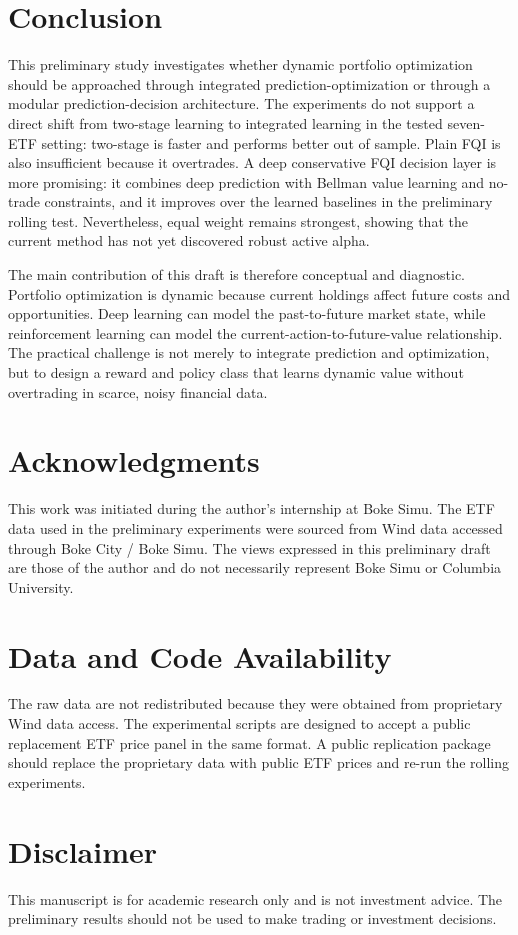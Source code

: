 \documentclass[11pt]{article}
\begin{document}
\section{Conclusion}

This preliminary study investigates whether dynamic portfolio optimization should be approached through integrated prediction-optimization or through a modular prediction-decision architecture. The experiments do not support a direct shift from two-stage learning to integrated learning in the tested seven-ETF setting: two-stage is faster and performs better out of sample. Plain FQI is also insufficient because it overtrades. A deep conservative FQI decision layer is more promising: it combines deep prediction with Bellman value learning and no-trade constraints, and it improves over the learned baselines in the preliminary rolling test. Nevertheless, equal weight remains strongest, showing that the current method has not yet discovered robust active alpha.

The main contribution of this draft is therefore conceptual and diagnostic. Portfolio optimization is dynamic because current holdings affect future costs and opportunities. Deep learning can model the past-to-future market state, while reinforcement learning can model the current-action-to-future-value relationship. The practical challenge is not merely to integrate prediction and optimization, but to design a reward and policy class that learns dynamic value without overtrading in scarce, noisy financial data.

\section*{Acknowledgments}

This work was initiated during the author's internship at Boke Simu. The ETF data used in the preliminary experiments were sourced from Wind data accessed through Boke City / Boke Simu. The views expressed in this preliminary draft are those of the author and do not necessarily represent Boke Simu or Columbia University.

\section*{Data and Code Availability}

The raw data are not redistributed because they were obtained from proprietary Wind data access. The experimental scripts are designed to accept a public replacement ETF price panel in the same format. A public replication package should replace the proprietary data with public ETF prices and re-run the rolling experiments.

\section*{Disclaimer}

This manuscript is for academic research only and is not investment advice. The preliminary results should not be used to make trading or investment decisions.



\end{document}
